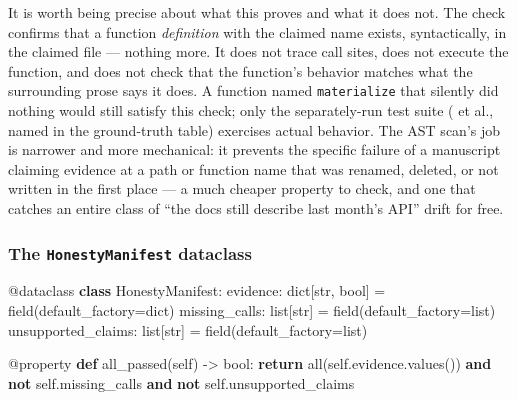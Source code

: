 \documentclass[
]{article}
\newenvironment{Shaded}{}{}
\newcommand{\AttributeTok}[1]{\textcolor[rgb]{0.49,0.56,0.16}{#1}}
\newcommand{\BuiltInTok}[1]{\textcolor[rgb]{0.00,0.50,0.00}{#1}}
\newcommand{\ControlFlowTok}[1]{\textcolor[rgb]{0.00,0.44,0.13}{\textbf{#1}}}
\newcommand{\KeywordTok}[1]{\textcolor[rgb]{0.00,0.44,0.13}{\textbf{#1}}}
\newcommand{\NormalTok}[1]{#1}
\newcommand{\OperatorTok}[1]{\textcolor[rgb]{0.40,0.40,0.40}{#1}}
\newcommand{\VariableTok}[1]{\textcolor[rgb]{0.10,0.09,0.49}{#1}}
\begin{document}
It is worth being precise about what this proves and what it does not.
The check confirms that a function \emph{definition} with the claimed
name exists, syntactically, in the claimed file --- nothing more. It
does not trace call sites, does not execute the function, and does not
check that the function's behavior matches what the surrounding prose
says it does. A function named \texttt{materialize} that silently did
nothing would still satisfy this check; only the separately-run test
suite ( et al., named in the ground-truth
table) exercises actual behavior. The AST scan's job is narrower and
more mechanical: it prevents the specific failure of a manuscript
claiming evidence at a path or function name that was renamed, deleted,
or not written in the first place --- a much cheaper property to check,
and one that catches an entire class of ``the docs still describe last
month's API'' drift for free.

\subsubsection{\texorpdfstring{The \texttt{HonestyManifest}
dataclass}{The HonestyManifest dataclass}}\label{the-honestymanifest-dataclass}

\begin{Shaded}
\begin{Highlighting}[]
\AttributeTok{@dataclass}
\KeywordTok{class}\NormalTok{ HonestyManifest:}
\NormalTok{    evidence: }\BuiltInTok{dict}\NormalTok{[}\BuiltInTok{str}\NormalTok{, }\BuiltInTok{bool}\NormalTok{] }\OperatorTok{=}\NormalTok{ field(default\_factory}\OperatorTok{=}\BuiltInTok{dict}\NormalTok{)}
\NormalTok{    missing\_calls: }\BuiltInTok{list}\NormalTok{[}\BuiltInTok{str}\NormalTok{] }\OperatorTok{=}\NormalTok{ field(default\_factory}\OperatorTok{=}\BuiltInTok{list}\NormalTok{)}
\NormalTok{    unsupported\_claims: }\BuiltInTok{list}\NormalTok{[}\BuiltInTok{str}\NormalTok{] }\OperatorTok{=}\NormalTok{ field(default\_factory}\OperatorTok{=}\BuiltInTok{list}\NormalTok{)}

    \AttributeTok{@property}
    \KeywordTok{def}\NormalTok{ all\_passed(}\VariableTok{self}\NormalTok{) }\OperatorTok{{-}\textgreater{}} \BuiltInTok{bool}\NormalTok{:}
        \ControlFlowTok{return} \BuiltInTok{all}\NormalTok{(}\VariableTok{self}\NormalTok{.evidence.values()) }\KeywordTok{and} \KeywordTok{not} \VariableTok{self}\NormalTok{.missing\_calls }\KeywordTok{and} \KeywordTok{not} \VariableTok{self}\NormalTok{.unsupported\_claims}
\end{Highlighting}
\end{Shaded}
\end{document}
